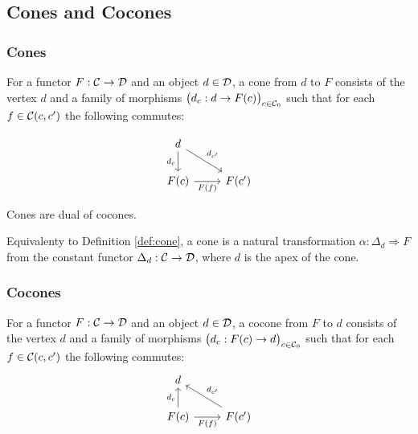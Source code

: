 \subsection{Cones and Cocones}

\subsubsection*{Cones}

\begin{definition}
	For a functor $F:\mathcal{C}\to \mathcal{D}$ and an object $d\in \mathcal{D}$, a cone from $d$ to $F$
	consists of the vertex $d$ and a family of morphisms $\big(d_c: d \to
	F(c)\big)_{c\in \mathcal{C}_0}$ such that for each $f\in \mathcal{C}(c, c')$ the following
	commutes:
	\parencite{awodey:category_theory}

	\[\begin{tikzcd}
		d \\
		{F(c)} & {F(c')}
		\arrow["{d_{c'}}", from=1-1, to=2-2]
		\arrow["{d_c}"', from=1-1, to=2-1]
		\arrow["{F(f)}"', from=2-1, to=2-2]
	\end{tikzcd}\]
\end{definition}

\begin{remark}
	Cones are dual of cocones.
\end{remark}

\begin{definition}
	Equivalenty to Definition \ref{def:cone}, a cone is a natural transformation
	$\alpha: \Delta_d \Rightarrow F$ from the constant functor $\Delta_d:\mathcal{C}\to
	\mathcal{D}$, where $d$ is the apex of the cone.
\end{definition}

\subsubsection*{Cocones}
\begin{definition}
	For a functor $F:\mathcal{C}\to \mathcal{D}$ and an object $d\in \mathcal{D}$, a cocone from $F$ to $d$
	consists of the vertex $d$ and a family of morphisms $\big(d_c: F(c) \to
	d\big)_{c\in \mathcal{C}_0}$ such that for each $f \in \mathcal{C}(c, c')$ the following
	commutes:
	\parencite{leinster:basic_category_theory}
	\[\begin{tikzcd}[ampersand replacement=\&]
		d \\
		{F(c)} \& {F(c')}
		\arrow["{d_{c'}}"', from=2-2, to=1-1]
		\arrow["{d_c}", from=2-1, to=1-1]
		\arrow["{F(f)}"', from=2-1, to=2-2]
	\end{tikzcd}\]
\end{definition}

